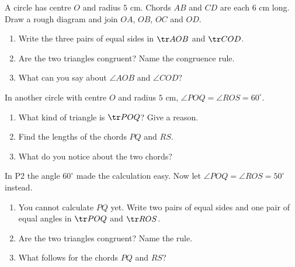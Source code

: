 \begin{solvefirst}
  \item A circle has centre $O$ and radius $5$ cm. Chords $AB$ and $CD$ are each $6$ cm long. Draw a rough diagram and join $OA$, $OB$, $OC$ and $OD$.
  \begin{enumerate}[label=(\alph*),itemsep=1pt]
    \item Write the three pairs of equal sides in $\tr AOB$ and $\tr COD$.
    \item Are the two triangles congruent? Name the congruence rule.
    \item What can you say about $\angle AOB$ and $\angle COD$?
  \end{enumerate}
  \item In another circle with centre $O$ and radius $5$ cm, $\angle POQ=\angle ROS=60^\circ$.
  \begin{enumerate}[label=(\alph*),itemsep=1pt]
    \item What kind of triangle is $\tr POQ$? Give a reason.
    \item Find the lengths of the chords $PQ$ and $RS$.
    \item What do you notice about the two chords?
  \end{enumerate}
  \item In P2 the angle $60^\circ$ made the calculation easy. Now let $\angle POQ=\angle ROS=50^\circ$ instead.
  \begin{enumerate}[label=(\alph*),itemsep=1pt]
    \item You cannot calculate $PQ$ yet. Write two pairs of equal sides and one pair of equal angles in $\tr POQ$ and $\tr ROS$.
    \item Are the two triangles congruent? Name the rule.
    \item What follows for the chords $PQ$ and $RS$?
  \end{enumerate}
\end{solvefirst}

